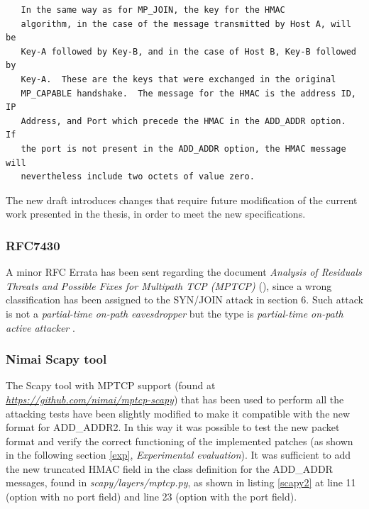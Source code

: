 \begin{verbatim}
   In the same way as for MP_JOIN, the key for the HMAC
   algorithm, in the case of the message transmitted by Host A, will be
   Key-A followed by Key-B, and in the case of Host B, Key-B followed by
   Key-A.  These are the keys that were exchanged in the original
   MP_CAPABLE handshake.  The message for the HMAC is the address ID, IP
   Address, and Port which precede the HMAC in the ADD_ADDR option.  If
   the port is not present in the ADD_ADDR option, the HMAC message will
   nevertheless include two octets of value zero.
\end{verbatim}

The new draft introduces changes that require future modification of the current work presented in the thesis, in order to meet the new specifications.

\subsubsection{RFC7430}
A minor RFC Errata has been sent regarding the document \textit{Analysis of Residuals Threats and Possible Fixes for Multipath TCP (MPTCP)} (), since a wrong classification has been assigned to the SYN/JOIN attack in section 6. Such attack is not a \textit{partial-time on-path eavesdropper} but the type is \textit{partial-time on-path active attacker} \cite{errata}.

\subsubsection{Nimai Scapy tool}
The Scapy tool with MPTCP support (found at \href{https://github.com/nimai/mptcp-scapy}{\textit{https://github.com/nimai/mptcp-scapy}}) that has been used to perform all the attacking tests have been slightly modified to make it compatible with the new format for ADD\_ADDR2. In this way it was possible to test the new packet format and verify the correct functioning of the implemented patches (as shown in the following section \ref{exp}, \textit{Experimental evaluation}). It was sufficient to add the new truncated HMAC field in the class definition for the ADD\_ADDR messages, found in \textit{scapy/layers/mptcp.py}, as shown in listing \ref{scapy2} at line 11 (option with no port field) and line 23 (option with the port field).

